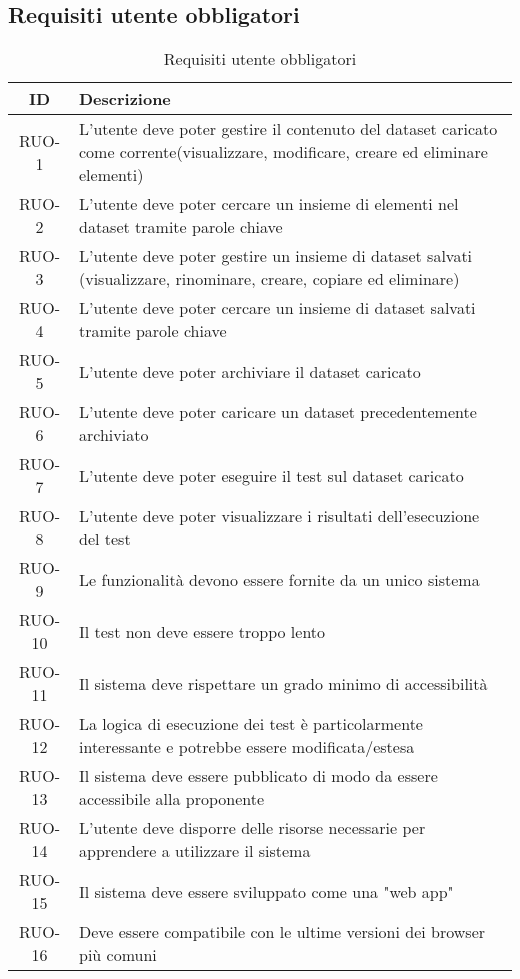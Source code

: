 \subsection{Requisiti utente obbligatori}
\begin{table}[H]
    \begin{tabularx}{\textwidth}{|c|X|}
        \hline
        \textbf{ID} & \textbf{Descrizione} \\
        \hline
        \label{ru:RUO-1} RUO-1 & L'utente deve poter gestire il contenuto del dataset caricato come corrente(visualizzare, modificare, creare ed eliminare elementi)\\ 
        \hline
        \label{ru:RUO-2} RUO-2 & L'utente deve poter cercare un insieme di elementi nel dataset tramite parole chiave \\ 
        \hline
        \label{ru:RUO-3} RUO-3 & L'utente deve poter gestire un insieme di dataset salvati (visualizzare, rinominare, creare, copiare ed eliminare)\\ \hline
        \label{ru:RUO-4} RUO-4 & L'utente deve poter cercare un insieme di dataset salvati tramite parole chiave \\ 
        \hline
        \label{ru:RUO-5} RUO-5 & L'utente deve poter archiviare il dataset caricato \\ 
        \hline
        \label{ru:RUO-6} RUO-6 & L'utente deve poter caricare un dataset precedentemente archiviato \\ 
        \hline
        \label{ru:RUO-7} RUO-7 & L'utente deve poter eseguire il test sul dataset caricato \\ \hline
        \label{ru:RUO-8} RUO-8 & L'utente deve poter visualizzare i risultati dell'esecuzione del test \\ \hline
        \label{ru:RUO-9} RUO-9 & Le funzionalità devono essere fornite da un unico sistema\\ \hline
        \label{ru:RUO-10} RUO-10 & Il test non deve essere troppo lento \\ 
        \hline 
        \label{ru:RUO-11} RUO-11 & Il sistema deve rispettare un grado minimo di accessibilità \\ 
        \hline
        \label{ru:RUO-12} RUO-12 & La logica di esecuzione dei test è particolarmente interessante e potrebbe essere modificata/estesa \\ 
        \hline
        \label{ru:RUO-13} RUO-13 & Il sistema deve essere pubblicato di modo da essere accessibile alla proponente \\ 
        \hline
        \label{ru:RUO-14} RUO-14 & L'utente deve disporre delle risorse necessarie per apprendere a utilizzare il sistema \\ 
        \hline
        \label{ru:RUO-15} RUO-15 &  Il sistema deve essere sviluppato come una "web app"\\ 
        \hline
        \label{ru:RUO-16} RUO-16 &  Deve essere compatibile con le ultime versioni dei browser più comuni \\ 
        \hline 
    \end{tabularx}
    \vspace{10px}
    \caption{Requisiti utente obbligatori}
\end{table}

